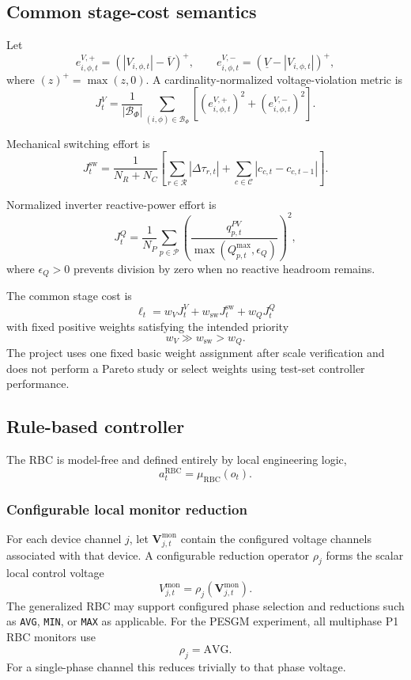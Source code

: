 \subsection{Common stage-cost semantics}
\label{subsec:p1_common_cost}

Let
\[
e_{i,\phi,t}^{V,+}
=
\left(|V_{i,\phi,t}|-\overline V\right)^+,
\qquad
e_{i,\phi,t}^{V,-}
=
\left(\underline V-|V_{i,\phi,t}|\right)^+,
\]
where $(z)^+=\max(z,0)$.  A cardinality-normalized voltage-violation metric is
\[
J_t^V
=
\frac{1}{|\mathcal B_\Phi|}
\sum_{(i,\phi)\in\mathcal B_\Phi}
\left[
\left(e_{i,\phi,t}^{V,+}\right)^2
+
\left(e_{i,\phi,t}^{V,-}\right)^2
\right].
\]

Mechanical switching effort is
\[
J_t^{\mathrm{sw}}
=
\frac{1}{N_R+N_C}
\left[
\sum_{r\in\mathcal R}
\left|\Delta\tau_{r,t}\right|
+
\sum_{c\in\mathcal C}
\left|c_{c,t}-c_{c,t-1}\right|
\right].
\]

Normalized inverter reactive-power effort is
\[
J_t^Q
=
\frac{1}{N_P}
\sum_{p\in\mathcal P}
\left(
\frac{q_{p,t}^{PV}}
{\max(Q_{p,t}^{\max},\epsilon_Q)}
\right)^2,
\]
where $\epsilon_Q>0$ prevents division by zero when no reactive headroom remains.

The common stage cost is
\[
\boxed{
\ell_t
=
w_V J_t^V
+
w_{\mathrm{sw}}J_t^{\mathrm{sw}}
+
w_QJ_t^Q
}
\]
with fixed positive weights satisfying the intended priority
\[
w_V\gg w_{\mathrm{sw}}>w_Q.
\]
The project uses one fixed basic weight assignment after scale verification and does not
perform a Pareto study or select weights using test-set controller performance.

\subsection{Rule-based controller}
\label{subsec:p1_rbc}

The RBC is model-free and defined entirely by local engineering logic,
\[
a_t^{\mathrm{RBC}}
=
\mu_{\mathrm{RBC}}(o_t).
\]

\subsubsection{Configurable local monitor reduction}

For each device channel $j$, let $\mathbf V_{j,t}^{\mathrm{mon}}$ contain the configured
voltage channels associated with that device.  A configurable reduction operator
$\rho_j$ forms the scalar local control voltage
\[
V_{j,t}^{\mathrm{mon}}
=
\rho_j\!\left(
\mathbf V_{j,t}^{\mathrm{mon}}
\right).
\]
The generalized RBC may support configured phase selection and reductions such as
\texttt{AVG}, \texttt{MIN}, or \texttt{MAX} as applicable.  For the PESGM experiment,
all multiphase P1 RBC monitors use
\[
\boxed{
\rho_j=\mathrm{AVG}.
}
\]
For a single-phase channel this reduces trivially to that phase voltage.

